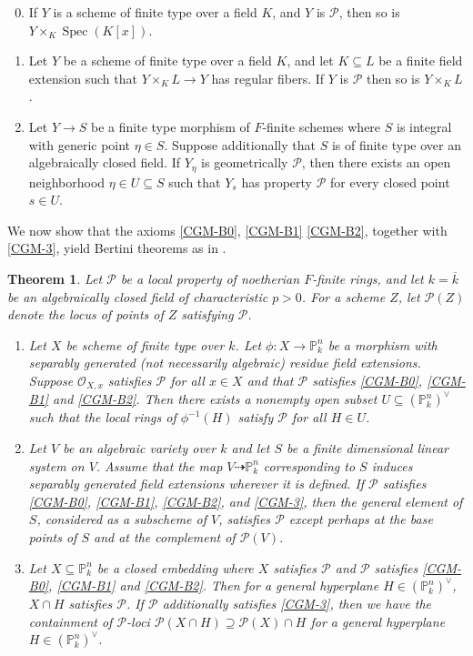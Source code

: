 \documentclass[reqno,11pt]{amsart}
\numberwithin{equation}{section}
\newtheorem{theorem}{Theorem}[section]
\theoremstyle{definition}
\theoremstyle{definition}
\theoremstyle{definition}
\theoremstyle{remark}
\newcommand{\Spec}{\operatorname{Spec}}
\newcommand{\PP}{\mathbb{P}}
\newcommand{\cO}{\mathcal{O}}
\newcommand{\cP}{\mathcal{P}}
\begin{document}
\begin{enumerate}[label=(B\arabic*)]
\setcounter{enumi}{-1}
    \item If $Y$ is a scheme of finite type over a field $K$, and $Y$ is $\cP$, then so is $Y \times_K \Spec(K[x])$. \label{CGM-B0}
    \item Let $Y$ be a scheme of finite type over a field $K$, and let $K \subseteq L$ be a finite field extension such that $Y \times_K L \to Y$ has regular fibers. If $Y$ is $\cP$ then  so is $Y \times_K L$. \label{CGM-B1}
    \item Let $Y \to S$ be a finite type morphism of $F$-finite schemes where $S$ is integral with generic point $\eta \in S$. Suppose additionally that $S$ is of finite type over an algebraically closed field. If $Y_\eta$ is geometrically $\cP$, then there exists an open neighborhood $\eta \in U \subseteq S$ such that $Y_s$ has property $\cP$ for every closed point $s \in U$. \label{CGM-B2}
\end{enumerate}

We now show that the axioms \ref{CGM-B0}, \ref{CGM-B1} \ref{CGM-B2}, together with \ref{CGM-3}, yield Bertini theorems as in \cite[Theorem 1, Corollary1, Corollary 2]{CGM86}.

\begin{theorem}\label{thm:CGM}
    Let $\cP$ be a local property of noetherian $F$-finite rings, and let $k=\overline{k}$ be an algebraically closed field of characteristic $p>0$. For a scheme $Z$, let $\cP(Z)$ denote the locus of points of $Z$ satisfying $\cP$.
    \begin{enumerate}[label=(\alph*)]
    \item \label{thm:CGM-1} Let $X$ be scheme of finite type over $k$. Let $\phi\colon X\to\PP^n_k$ be a morphism with separably generated (not necessarily algebraic) residue field extensions. Suppose $\cO_{X,x}$ satisfies $\cP$ for all $x\in X$ and that $\cP$ satisfies \ref{CGM-B0}, \ref{CGM-B1} and \ref{CGM-B2}. Then there exists a nonempty open subset $U\subseteq (\PP^n_k)^\vee$ such that the local rings of $\phi^{-1}(H)$ satisfy $\cP$ for all $H\in U$.
        \item \label{thm:CGM-2} Let $V$ be an algebraic variety over $k$ and let $S$ be a finite dimensional linear system on $V$. Assume that the map $V\dashrightarrow\PP^n_k$ corresponding to $S$ induces separably generated field extensions wherever it is defined. If $\cP$ satisfies \ref{CGM-B0}, \ref{CGM-B1}, \ref{CGM-B2}, and \ref{CGM-3}, then the general element of $S$, considered as a subscheme of $V$, satisfies $\cP$ except perhaps at the base points of $S$ and at the complement of $\cP(V)$.\label{cgm-thm-2}
        \item  \label{thm:CGM-3} Let $X\subseteq \PP^n_k$ be a closed embedding where $X$ satisfies $\cP$ and $\cP$ satisfies \ref{CGM-B0}, \ref{CGM-B1} and \ref{CGM-B2}. Then for a general hyperplane $H\in (\PP^n_k)^\vee$, $X\cap H$ satisfies $\cP$. If $\cP$ additionally satisfies \ref{CGM-3}, then we have the containment of $\cP$-loci $\cP(X\cap H)\supseteq \cP(X)\cap H$ for a general hyperplane $H\in (\PP^n_k)^\vee$.
    \end{enumerate}
\end{theorem}
\end{document}
